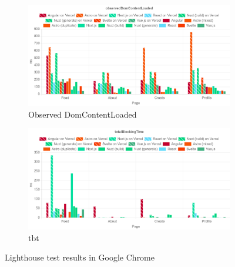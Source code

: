 \documentclass[a4paper, 12pt]{article}
\begin{document}
\begin{figure}[ht!]\ContinuedFloat
  \centering  
  \begin{subfigure}{0.8\linewidth}
    \begin{center}
      \includegraphics[width=\linewidth, keepaspectratio]{img/lighthouse-results/observedDomContentLoaded.png}
    \end{center}
    \caption{Observed DomContentLoaded}\label{subfig:LH:observedDomContentLoaded}
  \end{subfigure}
  \begin{subfigure}{0.8\linewidth}
    \begin{center}
      \includegraphics[width=\linewidth, keepaspectratio]{img/lighthouse-results/TBT.png}
    \end{center}
    \caption{\acrfull{tbt}}\label{subfig:LH:totalBlockingTime}
  \end{subfigure}
  \caption{Lighthouse test results in Google Chrome}
\end{figure}
\end{document}
